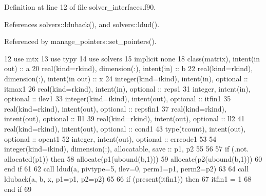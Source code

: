 Definition at line 12 of file solver\+\_\+interfaces.\+f90.



References solvers\+::lduback(), and solvers\+::ldud().



Referenced by manage\+\_\+pointers\+::set\+\_\+pointers().


\begin{DoxyCode}
12         \textcolor{keywordtype}{use }mtx
13         \textcolor{keywordtype}{use }typy
14         \textcolor{keywordtype}{use }solvers
15         \textcolor{keywordtype}{implicit none}
18         \textcolor{keywordtype}{class}(matrix), \textcolor{keywordtype}{intent(in out)} :: a
20         \textcolor{keywordtype}{real(kind=rkind)}, \textcolor{keywordtype}{dimension(:)}, \textcolor{keywordtype}{intent(in)} :: b
22         \textcolor{keywordtype}{real(kind=rkind)}, \textcolor{keywordtype}{dimension(:)}, \textcolor{keywordtype}{intent(in out)} :: x
24         \textcolor{keywordtype}{integer(kind=ikind)}, \textcolor{keywordtype}{intent(in)}, \textcolor{keywordtype}{optional} :: itmax1
26         \textcolor{keywordtype}{real(kind=rkind)}, \textcolor{keywordtype}{intent(in)}, \textcolor{keywordtype}{optional} :: reps1
31         \textcolor{keywordtype}{integer}, \textcolor{keywordtype}{intent(in)}, \textcolor{keywordtype}{optional} :: ilev1
33         \textcolor{keywordtype}{integer(kind=ikind)}, \textcolor{keywordtype}{intent(out)}, \textcolor{keywordtype}{optional} :: itfin1
35         \textcolor{keywordtype}{real(kind=rkind)}, \textcolor{keywordtype}{intent(out)}, \textcolor{keywordtype}{optional} :: repsfin1
37         \textcolor{keywordtype}{real(kind=rkind)}, \textcolor{keywordtype}{intent(out)}, \textcolor{keywordtype}{optional} :: ll1
39         \textcolor{keywordtype}{real(kind=rkind)}, \textcolor{keywordtype}{intent(out)}, \textcolor{keywordtype}{optional} :: ll2
41         \textcolor{keywordtype}{real(kind=rkind)}, \textcolor{keywordtype}{intent(out)}, \textcolor{keywordtype}{optional} :: cond1
43         \textcolor{keywordtype}{type}(tcount), \textcolor{keywordtype}{intent(out)}, \textcolor{keywordtype}{optional} :: opcnt1
52         \textcolor{keywordtype}{integer}, \textcolor{keywordtype}{intent(out)}, \textcolor{keywordtype}{optional} :: errcode1
53         
54         \textcolor{keywordtype}{integer(kind=ikind)}, \textcolor{keywordtype}{dimension(:)}, \textcolor{keywordtype}{allocatable}, \textcolor{keywordtype}{save} :: p1, p2
55         
56         
57         \textcolor{keywordflow}{if} (.not. \textcolor{keyword}{allocated}(p1)) \textcolor{keywordflow}{then}
58           \textcolor{keyword}{allocate}(p1(ubound(b,1)))
59           \textcolor{keyword}{allocate}(p2(ubound(b,1)))
60 \textcolor{keywordflow}{        end if}
61     
62          \textcolor{keyword}{call }ldud(a, pivtype=5, ilev=0, perm1=p1, perm2=p2)
63          
64          \textcolor{keyword}{call }lduback(a, b, x, p1=p1, p2=p2)
65          
66          \textcolor{keywordflow}{if} (\textcolor{keyword}{present}(itfin1)) \textcolor{keywordflow}{then} 
67            itfin1 = 1
68 \textcolor{keywordflow}{         end if}
69 
\end{DoxyCode}


